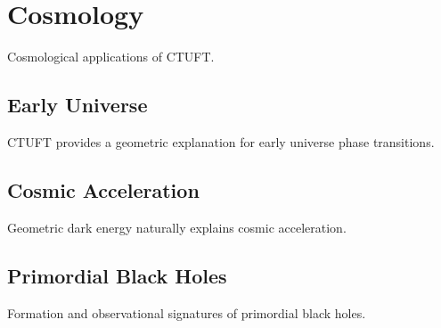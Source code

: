 \section{Cosmology}
\label{sec:cosmology}

Cosmological applications of CTUFT.

\subsection{Early Universe}

CTUFT provides a geometric explanation for early universe phase transitions.

\subsection{Cosmic Acceleration}

Geometric dark energy naturally explains cosmic acceleration.

\subsection{Primordial Black Holes}

Formation and observational signatures of primordial black holes.
